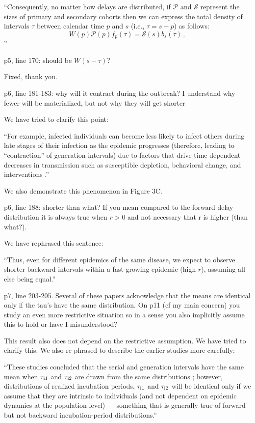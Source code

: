 \documentclass[12pt]{article}
\newcommand{\revtext}{\textsf}
\newcommand{\psymp}{\ensuremath{p}} %
\newcommand{\ssymp}{\ensuremath{s}} %
\newcommand{\psize}{{\mathcal P}} %
\newcommand{\ssize}{{\mathcal S}} %
\begin{document}
``Consequently, no matter how delays are distributed, if
$\mathcal P$ and $\mathcal S$ represent the sizes of primary and
secondary cohorts then we can express the total density of intervals $\tau$ between calendar time $\psymp$ and $\ssymp$ (i.e., $\tau=\ssymp-\psymp$) as follows:
\begin{equation}
W(\psymp) \psize(\psymp) f_\psymp(\tau) = \ssize(\ssymp) b_\ssymp(\tau) \,,
\end{equation}''

\revtext{p5, line 170: should be $W(s-\tau)$?}

Fixed, thank you.

\revtext{p6, line 181-183: why will it contract during the outbreak? I understand why fewer will be materialized, but not why they will get shorter}

We have tried to clarify this point:

``For example, infected individuals can become less likely to infect others during late stages of their infection as the epidemic progresses (therefore, leading to ``contraction'' of generation intervals) due to factors that drive time-dependent decreases in transmission such as susceptible depletion, behavioral change, and interventions \citep{champredon2015intrinsic}.''

We also demonstrate this phenomenon in Figure 3C.

\revtext{p6, line 188: shorter than what? If you mean compared to the forward delay distribution it is always true when $r>0$ and not necessary that r is higher (than what?).}

We have rephrased this sentence:

``Thus, even for different epidemics of the same disease, we expect to observe shorter backward intervals within a fast-growing epidemic (high $r$), assuming all else being equal.''

\revtext{p7, line 203-205. Several of these papers acknowledge that the means are identical only if the tau's have the same distribution. On p11 (cf my main concern) you study an even more restrictive situation so in a sense you also implicitly assume this to hold or have I misunderstood?}

This result also does not depend on the restrictive assumption. We have tried to clarify this. We also re-phrased to describe the earlier studies more carefully:

``These studies concluded that the serial and generation intervals have the same mean when $\tau_{\rm i1}$ and $\tau_{\rm i2}$ are drawn from the same distributions \citep{svensson2007note,klinkenberg2011correlation,champredon2018equivalence, britton2019estimation};
however, distributions of realized incubation periods, $\tau_{\rm i1}$ and $\tau_{\rm i2}$ will be identical only if we assume that they are intrinsic to individuals (and not dependent on epidemic dynamics at the population-level) ---
something that is generally true of forward but not backward incubation-period distributions.''
\end{document}
